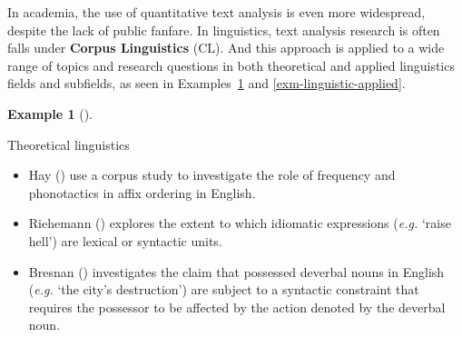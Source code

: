 \documentclass[
  letterpaper,
  krantz1]{latex/krantz-mod}
\providecommand{\tightlist}{%
  \setlength{\itemsep}{0pt}\setlength{\parskip}{0pt}}\usepackage{longtable,booktabs,array}
\theoremstyle{definition}
\theoremstyle{definition}
\newtheorem{example}{Example}[chapter]
\theoremstyle{remark}
\begin{document}
In academia, the use of quantitative text
analysis is even more widespread,
despite the lack of public fanfare. In linguistics, text analysis
research is often falls under \textbf{Corpus Linguistics}
(CL). And this approach is applied to a wide
range of topics and research questions in both theoretical
 and applied linguistics
 fields and subfields, as seen in
Examples~\ref{exm-linguistic-theory} and \ref{exm-linguistic-applied}.

\begin{example}[]\protect\hypertarget{exm-linguistic-theory}{}\label{exm-linguistic-theory}

Theoretical linguistics

\begin{itemize}
\tightlist
\item
  Hay () use a corpus study to investigate
  the role of frequency and phonotactics in affix ordering in English.
\item
  Riehemann () explores the extent to
  which idiomatic expressions (\emph{e.g.} `raise hell') are lexical or
  syntactic units.
\item
  Bresnan () investigates the claim
  that possessed deverbal nouns in English (\emph{e.g.} `the city's
  destruction') are subject to a syntactic constraint that requires the
  possessor to be affected by the action denoted by the deverbal noun.
\end{itemize}

\end{example}
\end{document}
